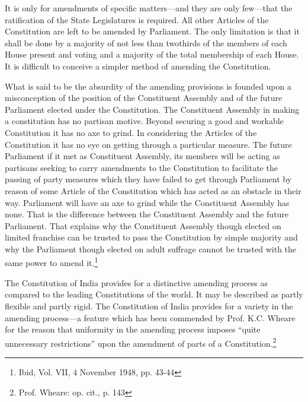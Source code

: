 \begin{multicols}{2}
\vspace{-.1cm}

\noi
 It is only for amendments of specific matters—and they are only few—that the ratification of
the State Legislatures is required. All other Articles of the Constitution are left to be amended
by Parliament. The only limitation is that it shall be done by a majority of not less than twothirds of the members of each House present and voting and a majority of the total membership
of each House. It is difficult to conceive a simpler method of amending the Constitution.

\vspace{-.1cm}

\noi
What is said to be the absurdity of the amending provisions is founded upon a misconception
of the position of the Constituent Assembly and of the future Parliament elected under the
Constitution. The Constituent Assembly in making a constitution has no partisan motive.
Beyond securing a good and workable Constitution it has no axe to grind. In considering the
Articles of the Constitution it has no eye on getting through a particular measure. The future Parliament if it met as Constituent Assembly, its members will be acting as partisans seeking
to carry amendments to the Constitution to facilitate the passing of party measures which they
have failed to get through Parliament by reason of some Article of the Constitution which has
acted as an obstacle in their way. Parliament will have an axe to grind while the Constituent
Assembly has none. That is the difference between the Constituent Assembly and the future
Parliament. That explains why the Constituent Assembly though elected on limited franchise
can be trusted to pass the Constitution by simple majority and why the Parliament though
elected on adult suffrage cannot be trusted with the same power to amend it.\footnote{Ibid, Vol. VII, 4 November 1948, pp. 43-44}

\vspace{-.1cm}


\vspace{-.1cm}

\noi
The Constitution of India provides for a distinctive amending process as compared to the
leading Constitutions of the world. It may be described as partly flexible and partly rigid. The
Constitution of India provides for a variety in the amending process—a feature which has
been commended by Prof. K.C. Wheare for the reason that uniformity in the amending process
imposes “quite unnecessary restrictions” upon the amendment of parts of a Constitution.\footnote{Prof. Wheare: op. cit., p. 143}


\end{multicols}
